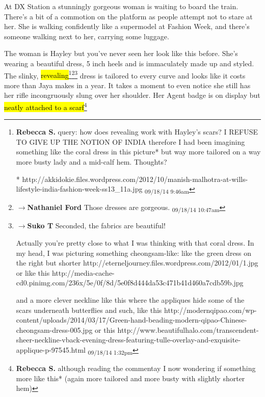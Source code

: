 At DX Station a stunningly gorgeous woman is waiting to board the train.  There's a bit of a commotion on the platform as people attempt not to stare at her.  She is walking confidently like a supermodel at Fashion Week, and there's someone walking next to her, carrying some luggage.  



The woman is Hayley but you've never seen her look like this before.  She's wearing a beautiful dress, 5 inch heels and is immaculately made up and styled. The slinky, \hl{revealing}\footnote{\textbf{Rebecca S. }query: how does revealing work with Hayley's scars? 
I REFUSE TO GIVE UP THE NOTION OF INDIA therefore I had been imagining something like the coral dress in this picture* but way more tailored on a way more busty lady and a mid-calf hem. 
Thoughts?

* http://akkidokie.files.wordpress.com/2012/10/manish-malhotra-at-wills-lifestyle-india-fashion-week-ss13\_11a.jpg \textsubscript{09/18/14 9:46am}}\footnote{$\rightarrow$\textbf{Nathaniel Ford }Those dresses are gorgeous. \textsubscript{09/18/14 10:47am}}\footnote{$\rightarrow$\textbf{Suko T }Seconded, the fabrics are beautiful!

Actually you're pretty close to what I was thinking with that coral dress.  In my head, I was picturing something cheongsam-like:
like the green dress on the right but shorter
http://eterneljourney.files.wordpress.com/2012/01/1.jpg
or like this
http://media-cache-cd0.pinimg.com/236x/5e/0f/8d/5e0f8d444da53c471b41d460a7cdb59b.jpg

and a more clever neckline like this where the appliques hide some of the scars underneath butterflies and such, like this
http://modernqipao.com/wp-content/uploads/2014/03/17/Green-hand-beading-modern-qipao-Chinese-cheongsam-dress-005.jpg 
or this
http://www.beautifulhalo.com/transcendent-sheer-neckline-vback-evening-dress-featuring-tulle-overlay-and-exquisite-applique-p-97545.html \textsubscript{09/18/14 1:32pm}} dress is tailored to every curve and looks like it costs more than Jaya makes in a year.  It takes a moment to even notice she still has her rifle incongruously slung over her shoulder.  Her Agent badge is on display but \hl{neatly attached to a scarf}\footnote{\textbf{Rebecca S. }although reading the commentay I now wondering if something more like this*  (again more tailored and more busty with slightly shorter hem)

}
